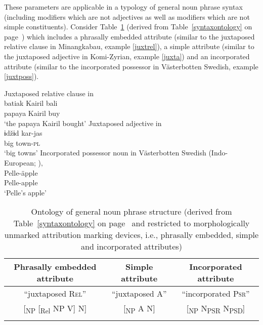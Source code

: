 These parameters are applicable in a typology of general noun phrase syntax (including modifiers which are not adjectives as well as modifiers which are not simple constituents). Consider Table~\ref{ontologyderived} (derived from Table~\ref{syntaxontology} on page~\pageref{syntaxontology}) which includes a phrasally embedded attribute (similar to the juxtaposed relative clause in Minangkabau, example \ref{juxtrel}), a simple attribute (similar to the juxtaposed adjective in Komi-Zyrian, example \ref{juxta}) and an incorporated attribute (similar to the incorporated possessor in Västerbotten Swedish, example \ref{juxtposs}).
\begin{exe}
\ex
\begin{xlist}
\ex
\label{juxtrel}
{\rm Juxtaposed relative clause in }\\
\gll batiak Kairil bali\\
	papaya Kairil buy\\
\glt	‘the papaya Kairil bought’
\ex
\label{juxta}
{\rm Juxtaposed adjective in }\\
\gll		ɨdžɨd		kar-jas\\
		big		town-\textsc{pl}\\
\glt		‘big towns’
\ex
\label{juxtposs}
{\rm Incorporated possessor noun in Västerbotten Swedish (Indo\hyp{}European; \citealt[examples from][3–4]{gil2005})}‚\\
\gll	Pelle-äpple\\
	Pelle-apple\\
\glt	‘Pelle's apple’
\end{xlist}
\end{exe}
\begin{table}
\begin{tabular}{c c c}
\lsptoprule
Phrasally embedded	attribute		&Simple	attribute				&Incorporated attribute\\
\midrule
“juxtaposed \textsc{Rel}”		&“juxtaposed \textsc{A}”		&“incorporated \textsc{Psr}”\\
\midrule
{[}\textsubscript{NP} [\textsubscript{Rel} NP V] N]	&[\textsubscript{NP} A N]			&[\textsubscript{NP} N\textsubscript{PSR} N\textsubscript{PSD}]\\
\lspbottomrule
\end{tabular}
\caption[Ontology of general noun phrase structure]{Ontology of general noun phrase structure (derived from Table~\ref{syntaxontology} on page~\pageref{syntaxontology} and restricted to morphologically unmarked attribution marking devices, i.e., phrasally embedded, simple and incorporated attributes)}\label{ontologyderived}
\end{table}

